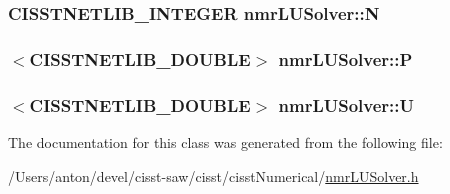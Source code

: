 \subsubsection[{N}]{\setlength{\rightskip}{0pt plus 5cm}C\+I\+S\+S\+T\+N\+E\+T\+L\+I\+B\+\_\+\+I\+N\+T\+E\+G\+E\+R nmr\+L\+U\+Solver\+::\+N\hspace{0.3cm}{\ttfamily [protected]}}\label{classnmr_l_u_solver_ad757f79f286e11fa14ff4890acfc3ac0}
\hypertarget{classnmr_l_u_solver_a221f406c2d7cc55ed7f077a2e4c990cb}{}
\subsubsection[{P}]{$<$C\+I\+S\+S\+T\+N\+E\+T\+L\+I\+B\+\_\+\+D\+O\+U\+B\+L\+E$>$ nmr\+L\+U\+Solver\+::\+P\hspace{0.3cm}{\ttfamily [protected]}}\label{classnmr_l_u_solver_a221f406c2d7cc55ed7f077a2e4c990cb}
\hypertarget{classnmr_l_u_solver_a02868ccfffd41664e2883641de95650f}{}
\subsubsection[{U}]{$<$C\+I\+S\+S\+T\+N\+E\+T\+L\+I\+B\+\_\+\+D\+O\+U\+B\+L\+E$>$ nmr\+L\+U\+Solver\+::\+U\hspace{0.3cm}{\ttfamily [protected]}}\label{classnmr_l_u_solver_a02868ccfffd41664e2883641de95650f}


The documentation for this class was generated from the following file\+:\begin{DoxyCompactItemize}
\item 
/\+Users/anton/devel/cisst-\/saw/cisst/cisst\+Numerical/\hyperlink{nmr_l_u_solver_8h}{nmr\+L\+U\+Solver.\+h}\end{DoxyCompactItemize}
